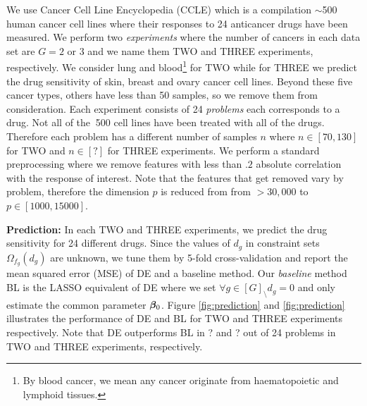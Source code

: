 We use Cancer Cell Line Encyclopedia (CCLE) \cite{barretina2012cancer} which is a compilation $\sim$500 human cancer cell lines where their responses to 24 anticancer drugs have been measured.%
We perform two \emph{experiments} where the number of cancers in each data set are $G =2$ or $3$ and we name them TWO and THREE experiments, respectively. 
We consider lung and blood\footnote{By blood cancer, we mean any cancer originate from haematopoietic and lymphoid tissues.} for TWO while for THREE we predict the drug sensitivity of skin, breast and ovary cancer cell lines. 
Beyond these five cancer types, others have less than 50 samples, so we remove them from consideration.
Each experiment consists of 24 \emph{problems} each corresponds to a drug. %
Not all of the $~$500 cell lines have been treated with all of the drugs. 
Therefore each problem has a different number of samples $n$ where $n \in [70, 130]$ for TWO and $n \in [?]$ for THREE experiments.
We perform a standard preprocessing \cite{barretina2012cancer} where we remove features with less than $.2$ absolute correlation with the response of interest.%
Note that the features that get removed vary by problem, therefore the dimension $p$ is reduced from from $>30,000$ to $p \in [1000, 15000]$. 

{\bf Prediction:} In each TWO and THREE experiments, we predict the drug sensitivity for 24 different drugs.  %
Since the values of $d_g$  in constraint sets $\Omega_{f_g}(d_g)$  are unknown, we tune them by 5-fold cross-validation and report the mean squared error (MSE) of DE and a baseline method. 
Our \emph{baseline} method BL is the LASSO \cite{tibs96} equivalent of DE where we set $\forall g \in [G]_\setminus d_g = 0$ and only estimate the common parameter $\boldsymbol{\beta}_0$. 
Figure \ref{fig:prediction} and \ref{fig:prediction} illustrates the performance of DE and BL for TWO and THREE experiments respectively. 
Note that DE outperforms BL in ? and ? out of 24 problems in TWO and THREE experiments, respectively.

